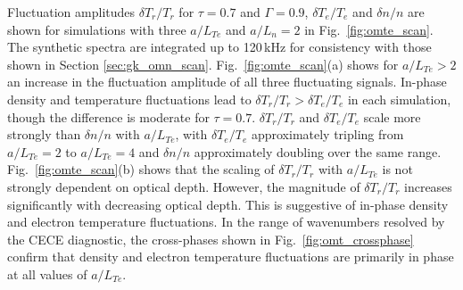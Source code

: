 \documentclass[%
 aip,
 amsmath,amssymb,
 reprint,%
]{revtex4-1}
\begin{document}
Fluctuation amplitudes $\delta T_r/T_r$  for $\tau=0.7$ and $\Gamma=0.9$, $\delta T_e/T_e$  and $\delta n/n$ are shown for simulations with three $a/L_{Te}$ and $a/L_{n}=2$ in Fig.\ \ref{fig:omte_scan}. The synthetic spectra are integrated up to 120\,kHz for consistency with those shown in Section \ref{sec:gk_omn_scan}. Fig.\ \ref{fig:omte_scan}(a) shows for $a/L_{Te}>2$ an increase in the fluctuation amplitude of all three fluctuating signals. In-phase density and temperature fluctuations lead to $\delta T_r /T_r > \delta T_e /T_e$ in each simulation, though the difference is moderate for $\tau=0.7$. $\delta T_r /T_r$ and $\delta T_e/T_e$  scale more strongly than $\delta n /n$ with $a/L_{Te}$, with $\delta T_e/T_e$  approximately tripling from $a/L_{Te}=2$ to $a/L_{Te}=4$ and $\delta n/n$ approximately doubling over the same range. Fig.\ \ref{fig:omte_scan}(b) shows that the scaling of $\delta T_r/T_r$  with $a/L_{Te}$ is not strongly dependent on optical depth. However, the magnitude of $\delta T_r/T_r$ increases significantly with decreasing optical depth. This is suggestive of in-phase density and electron temperature fluctuations. In the range of wavenumbers resolved by the CECE diagnostic, the cross-phases shown in Fig.\ \ref{fig:omt_crossphase} confirm that density and electron temperature fluctuations are primarily in phase at all values of $a/L_{Te}$.


\end{document}
